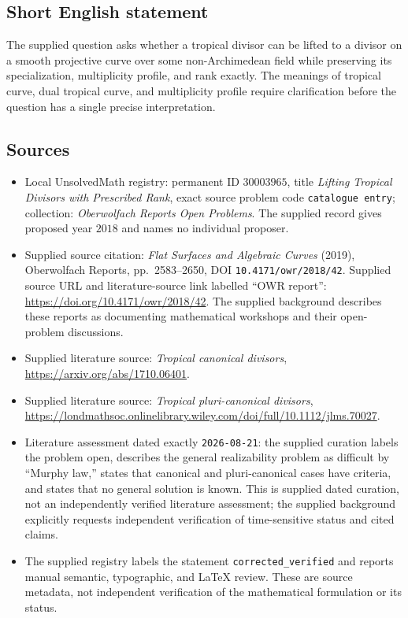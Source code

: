 \documentclass[11pt]{article}
\begin{document}
\subsection{Short English statement}
The supplied question asks whether a tropical divisor can be lifted to a divisor on a smooth projective curve over some non-Archimedean field while preserving its specialization, multiplicity profile, and rank exactly. The meanings of tropical curve, dual tropical curve, and multiplicity profile require clarification before the question has a single precise interpretation.
\subsection{Sources}
\begin{itemize}
\item Local UnsolvedMath registry: permanent ID \(30003965\), title \emph{Lifting Tropical Divisors with Prescribed Rank}, exact source problem code \texttt{catalogue entry}; collection: \emph{Oberwolfach Reports Open Problems}. The supplied record gives proposed year \(2018\) and names no individual proposer.
\item Supplied source citation: \emph{Flat Surfaces and Algebraic Curves} (2019), Oberwolfach Reports, pp.\ 2583--2650, DOI \texttt{10.4171/owr/2018/42}. Supplied source URL and literature-source link labelled ``OWR report'': \url{https://doi.org/10.4171/owr/2018/42}. The supplied background describes these reports as documenting mathematical workshops and their open-problem discussions.
\item Supplied literature source: \emph{Tropical canonical divisors}, \url{https://arxiv.org/abs/1710.06401}.
\item Supplied literature source: \emph{Tropical pluri-canonical divisors}, \url{https://londmathsoc.onlinelibrary.wiley.com/doi/full/10.1112/jlms.70027}.
\item Literature assessment dated exactly \texttt{2026-08-21}: the supplied curation labels the problem open, describes the general realizability problem as difficult by ``Murphy law,'' states that canonical and pluri-canonical cases have criteria, and states that no general solution is known. This is supplied dated curation, not an independently verified literature assessment; the supplied background explicitly requests independent verification of time-sensitive status and cited claims.
\item The supplied registry labels the statement \texttt{corrected\_verified} and reports manual semantic, typographic, and LaTeX review. These are source metadata, not independent verification of the mathematical formulation or its status.
\end{itemize}
\end{document}
